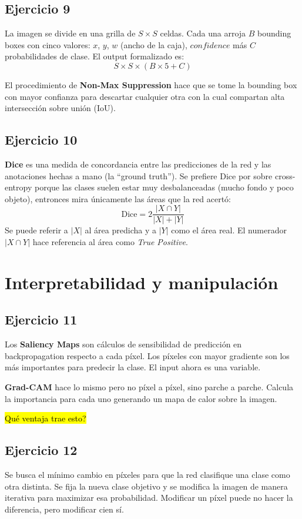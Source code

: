 \documentclass[a4paper,11pt]{article}
\begin{document}
\subsection*{Ejercicio 9}
La imagen se divide en una grilla de $S \times S$ celdas. Cada una arroja $B$ bounding boxes con cinco valores: $x$, $y$, $w$ (ancho de la caja), $confidence$ más $C$ probabilidades de clase. El output formalizado es: \[S \times S \times (B \times 5 + C)\]

El procedimiento de \textbf{Non-Max Suppression} hace que se tome la bounding box con mayor confianza para descartar cualquier otra con la cual compartan alta intersección sobre unión (IoU).
\subsection*{Ejercicio 10}
\textbf{Dice} es una medida de concordancia entre las predicciones de la red y las anotaciones hechas a mano (la ``ground truth''). Se prefiere Dice por sobre cross-entropy porque las clases suelen estar muy desbalanceadas (mucho fondo y poco objeto), entronces mira únicamente las áreas que la red acertó: \[\text{Dice} = 2\frac{|X \cap Y|}{|X|+|Y|}\]
Se puede referir a $|X|$ al área predicha y a $|Y|$ como el área real. El numerador $|X \cap Y|$ hace referencia al área como \textit{True Positive}.
\section*{Interpretabilidad y manipulación}
\subsection*{Ejercicio 11}
Los \textbf{Saliency Maps} son cálculos de sensibilidad de predicción en backpropagation respecto a cada píxel. Los píxeles con mayor gradiente son los más importantes para predecir la clase. El input ahora es una variable.


\textbf{Grad-CAM} hace lo mismo pero no píxel a píxel, sino parche a parche. Calcula la importancia para cada uno generando un mapa de calor sobre la imagen.

\hl{Qué ventaja trae esto?}
\subsection*{Ejercicio 12}
Se busca el mínimo cambio en píxeles para que la red clasifique una clase como otra distinta. Se fija la nueva clase objetivo y se modifica la imagen de manera iterativa para maximizar esa probabilidad. Modificar un píxel puede no hacer la diferencia, pero modificar cien sí.
\end{document}
